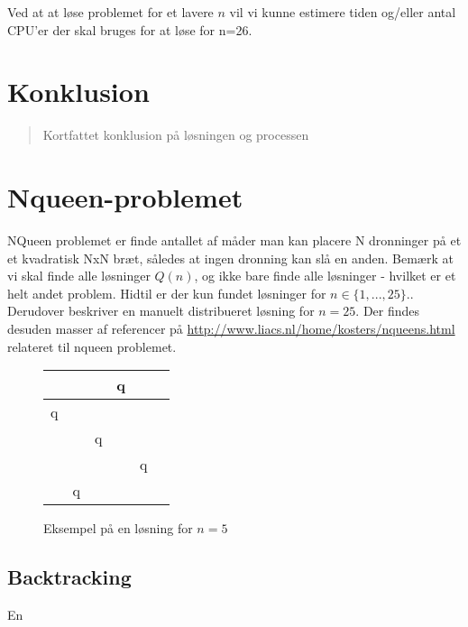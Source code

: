 \documentclass[final,a4paper,10pt]{article}
\def\chs#1{{\chessfont#1}}
\begin{document}
Ved at at løse problemet for et lavere $n$ vil vi kunne estimere tiden og/eller antal CPU'er der skal bruges for at løse for n=26.

\section{Konklusion}\label{konklusion}
\begin{verse}
	Kortfattet konklusion på løsningen og processen
\end{verse}

\section{Nqueen-problemet}\label{nqueenproblemet}

NQueen problemet er finde antallet af måder man kan placere N dronninger på et et kvadratisk NxN bræt, således at ingen dronning kan slå en anden. Bemærk at vi skal finde alle løsninger $Q(n)$, og ikke bare finde alle løsninger - hvilket er et helt andet problem. Hidtil er der kun fundet løsninger for $n \in \{1,...,25\}$.\cite{sekvenser}. Derudover beskriver \cite{etsi} en manuelt distribueret løsning for $n=25$. Der findes desuden masser af referencer på \url{http://www.liacs.nl/home/kosters/nqueens.html} relateret til nqueen problemet. 


\begin{figure}
\begin{center}
\begin{tabular}{|c|c|c|c|c|c}
\hline	 &  & &   \chs{q} & \\
\hline	\chs{q} & &  &  & \\
\hline	 & & \chs{q} &  &  \\
\hline	 &  &  & & \chs{q} \\
\hline	 & \chs{q} & &  &  \\
\hline
\end{tabular}
\end{center}
\caption{Eksempel på en løsning for $n=5$}
\end{figure}


\subsection{Backtracking}\label{backtracking}

En 

\end{document}
